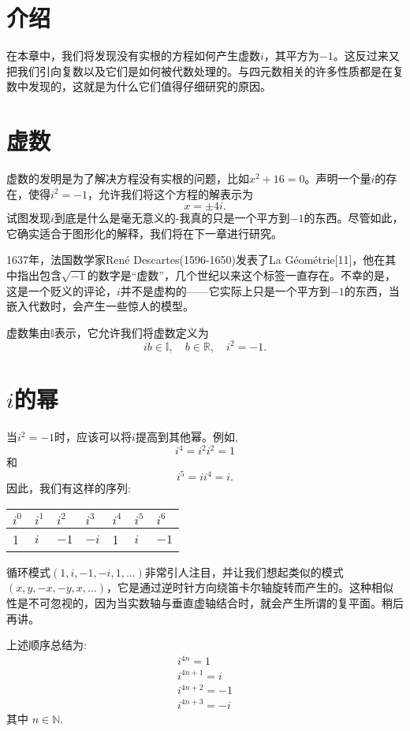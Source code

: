 \section{介绍}
在本章中，我们将发现没有实根的方程如何产生虚数$i$，其平方为$-1$。这反过来又把我们引向复数以及它们是如何被代数处理的。与四元数相关的许多性质都是在复数中发现的，这就是为什么它们值得仔细研究的原因。

\section{虚数}
虚数的发明是为了解决方程没有实根的问题，比如$x^{2}+16=0$。声明一个量$i$的存在，使得$i^{2}=-1$，允许我们将这个方程的解表示为
$$
x=\pm 4 i .
$$
试图发现$i$到底是什么是毫无意义的-我真的只是一个平方到$-1$的东西。尽管如此，它确实适合于图形化的解释，我们将在下一章进行研究。

1637年，法国数学家René Descartes(1596-1650)发表了La Géométrie[11]，他在其中指出包含$\sqrt{-1}$的数字是“虚数”，几个世纪以来这个标签一直存在。不幸的是，这是一个贬义的评论，$i$并不是虚构的——它实际上只是一个平方到$-1$的东西，当嵌入代数时，会产生一些惊人的模型。

虚数集由$\mathbb{I}$表示，它允许我们将虚数定义为
$$
i b \in \mathbb{I}, \quad b \in \mathbb{R}, \quad i^{2}=-1 .
$$

\section{$i$的幂}
当$i^{2}=-1$时，应该可以将$i$提高到其他幂。例如,
$$
i^{4}=i^{2} i^{2}=1
$$
和
$$
i^{5}=i i^{4}=i .
$$
因此，我们有这样的序列:
\begin{center}
\begin{tabular}{lllllll}
\hline
$i^{0}$ & $i^{1}$ & $i^{2}$ & $i^{3}$ & $i^{4}$ & $i^{5}$ & $i^{6}$ \\
\hline
1 & $i$ & $-1$ & $-i$ & 1 & $i$ & $-1$ \\
\hline
\end{tabular}
\end{center}
循环模式$(1,i,-1,-i, 1, \ldots)$非常引人注目，并让我们想起类似的模式$(x, y,-x,-y, x, \ldots)$，它是通过逆时针方向绕笛卡尔轴旋转而产生的。这种相似性是不可忽视的，因为当实数轴与垂直虚轴结合时，就会产生所谓的复平面。稍后再讲。

上述顺序总结为:
$$
\begin{gathered}
i^{4 n}=1 \\
i^{4 n+1}=i \\
i^{4 n+2}=-1 \\
i^{4 n+3}=-i
\end{gathered}
$$
其中 $n \in \mathbb{N}$.

